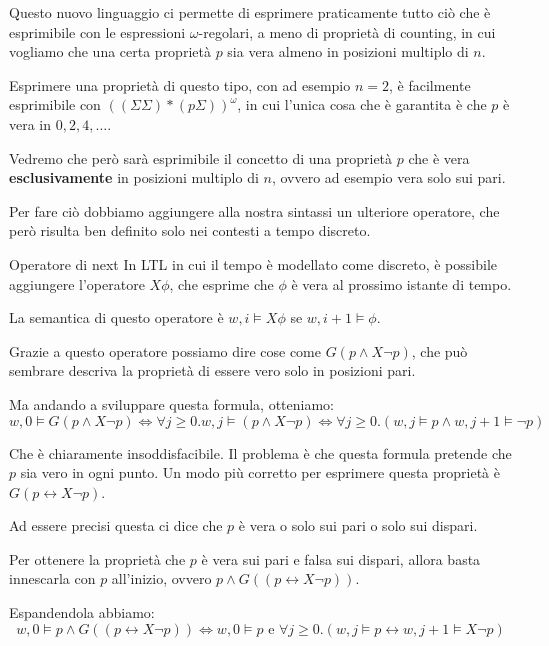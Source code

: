 Questo nuovo linguaggio ci permette di esprimere praticamente tutto ciò che è esprimibile con le espressioni \(\omega\)-regolari, a meno di proprietà di counting, in cui vogliamo che una certa proprietà \(p\) sia vera almeno in posizioni multiplo di \(n\).

Esprimere una proprietà di questo tipo, con ad esempio \(n=2\), è facilmente esprimibile con \({((\Sigma\Sigma)*(p\Sigma))}^\omega\), in cui l'unica cosa che è garantita è che \(p\) è vera in \(0,2,4,\ldots\).

Vedremo che però sarà esprimibile il concetto di una proprietà \(p\) che è vera \textbf{esclusivamente} in posizioni multiplo di \(n\), ovvero ad esempio vera solo sui pari.

Per fare ciò dobbiamo aggiungere alla nostra sintassi un ulteriore operatore, che però risulta ben definito solo nei contesti a tempo discreto.

\begin{definition}{Operatore di next}
  In LTL in cui il tempo è modellato come discreto, è possibile aggiungere l'operatore \(X \phi\), che esprime che \(\phi\) è vera al prossimo istante di tempo.

  La semantica di questo operatore è \(w,i \models X\phi\) se \(w,i+1 \models \phi\).
\end{definition}


Grazie a questo operatore possiamo dire cose come \(G(p\land X \neg p)\), che può sembrare descriva la proprietà di essere vero solo in posizioni pari.

Ma andando a sviluppare questa formula, otteniamo:
\[w,0\models G(p\land X \neg p) \iff \forall j \geq 0. w,j \models (p\land X \neg p) \iff \forall j \geq 0. (w,j \models p \land w,j+1 \models \neg p)\]

Che è chiaramente insoddisfacibile. Il problema è che questa formula pretende che \(p\) sia vero in ogni punto.
Un modo più corretto per esprimere questa proprietà è \(G(p \leftrightarrow X \neg p) \).

Ad essere precisi questa ci dice che \(p\) è vera o solo sui pari o solo sui dispari.

Per ottenere la proprietà che \(p\) è vera sui pari e falsa sui dispari, allora basta innescarla con \(p\) all'inizio, ovvero \(p \land G((p \leftrightarrow X \neg p) )\).

Espandendola abbiamo:
\[w,0 \models p \land G((p \leftrightarrow X \neg p) )\iff w,0 \models p \text{ e } \forall j \geq 0. (w,j \models p \leftrightarrow w,j+1 \models X \neg p)\]

